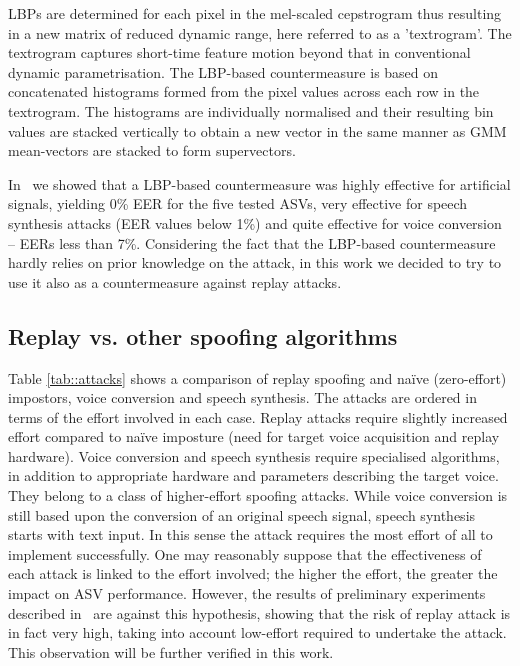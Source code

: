 LBPs are determined for each pixel in the mel-scaled cepstrogram thus resulting in a new matrix of reduced dynamic range, here referred to as a 'textrogram'.  The textrogram captures short-time feature motion beyond that in conventional dynamic parametrisation.  The LBP-based countermeasure is based on concatenated histograms formed from the pixel values across each row in the textrogram.  The histograms are individually normalised and their resulting bin values are stacked vertically to obtain a new vector in the same manner as GMM mean-vectors are stacked to form supervectors.  

In~\cite{Alegre2013a} we showed that a LBP-based countermeasure was highly effective for artificial signals, yielding 0\% EER for the five tested ASVs, very effective for speech synthesis attacks (EER values below 1\%) and quite effective for voice conversion -- EERs less than 7\%. Considering the fact that the LBP-based countermeasure hardly relies on prior knowledge on the attack, in this work we decided to try to use it also as a countermeasure against replay attacks.

\subsection{Replay vs. other spoofing algorithms}
\label{sec::algorithms::playback}


Table \ref{tab::attacks} shows a comparison of replay spoofing and na\"{i}ve (zero-effort) impostors, voice conversion and speech synthesis. The attacks are ordered in terms of the effort involved in each case. Replay attacks require slightly increased effort compared to na\"{i}ve imposture (need for target voice acquisition and replay hardware). Voice conversion and speech synthesis require specialised algorithms, in addition to appropriate hardware and parameters describing the target voice. They belong to a class of higher-effort spoofing attacks. While voice conversion is still based upon the conversion of an original speech signal, speech synthesis starts with text input. In this sense the attack requires the most effort of all to implement successfully. One may reasonably suppose that the effectiveness of each attack is linked to the effort involved; the higher the effort, the greater the impact on ASV performance. However, the results of preliminary experiments described in~\cite{Alegre2014a} are against this hypothesis, showing that the risk of replay attack is in fact very high, taking into account low-effort required to undertake the attack. This observation will be further verified in this work.

